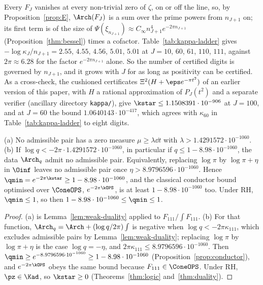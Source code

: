 Every $F_J$ vanishes at every non-trivial zero of $\zeta$, on or off the line, so, by Proposition~\ref{prop:E}, $\Arch(F_J)$ is a sum over the
prime powers from $n_{J+1}$ on; its first term is of the size of $\Psi(\xi_{n_{J+1}})\approx C_\infty n_{J+1}^4e^{-2\pi n_{J+1}}$
(Proposition~\ref{thm:bessel}) times a cofactor. Table~\ref{tab:kappa-ladder} gives $-\log\kappa_J/n_{J+1}=2.55$, $4.55$, $4.56$, $5.01$, $5.01$
at $J=10$, $60$, $61$, $110$, $111$, against $2\pi\approx6.28$ for the factor $e^{-2\pi n_{J+1}}$ alone. So the number of certified digits is
governed by $n_{J+1}$, and it grows with $J$ for as long as positivity can be certified. As a cross-check, the cushioned
certificates $\Xi^2(H+\eps e^{-\pi t^2})$ of an earlier version of this paper, with $H$ a rational approximation of $P_J(t^2)$ and a
separate verifier (ancillary directory \nolinkurl{kappa/}), give $\kstar\le1.1508391\cdot10^{-906}$ at $J=100$, and at $J=60$ the bound
$1.0640143\cdot10^{-417}$, which agrees with $\kappa_{60}$ in Table~\ref{tab:kappa-ladder} to eight digits.

\begin{corollary}\label{cor:qmin}
(a) No admissible pair has a zero measure $\mu\ge\lambda\dd t$ with $\lambda>1.4291572\cdot10^{-1060}$.
(b) If $\log q<-2\pi\cdot1.4291572\cdot10^{-1060}$, in particular if $q\le1-8.98\cdot10^{-1060}$, the data $\Arch_q$ admit
no admissible pair. Equivalently, replacing $\log\pi$ by $\log\pi+\eta$ in $\Oinf$ leaves no admissible pair once
$\eta>8.9796596\cdot10^{-1060}$. Hence $\qmin=e^{-2\pi\kstar}\ge1-8.98\cdot10^{-1060}$, and the classical conductor bound optimised over
$\ConeOPS$, $e^{-2\pi\kOPS}$, is at least $1-8.98\cdot10^{-1060}$ too. Under RH, $\qmin\le1$, so then $1-8.98\cdot10^{-1060}\le\qmin\le1$.
\end{corollary}

\begin{proof}
(a) is Lemma~\ref{lem:weak-duality} applied to $F_{111}/\int F_{111}$. (b) For that function,
$\Arch_q=\Arch+(\log q/2\pi)\int$ is negative when $\log q<-2\pi\kappa_{111}$, which excludes admissible pairs by
Lemma~\ref{lem:weak-duality}; replacing $\log\pi$ by $\log\pi+\eta$ is the case $\log q=-\eta$, and
$2\pi\kappa_{111}\le8.9796596\cdot10^{-1060}$. Then $\qmin\ge e^{-8.9796596\cdot10^{-1060}}\ge1-8.98\cdot10^{-1060}$
(Proposition~\ref{prop:conductor}), and $e^{-2\pi\kOPS}$ obeys the same bound because $F_{111}\in\ConeOPS$. Under RH, $\pz\in\Kad$, so
$\kstar\ge0$ (Theorems~\ref{thm:logic} and~\ref{thm:duality}).
\end{proof}

